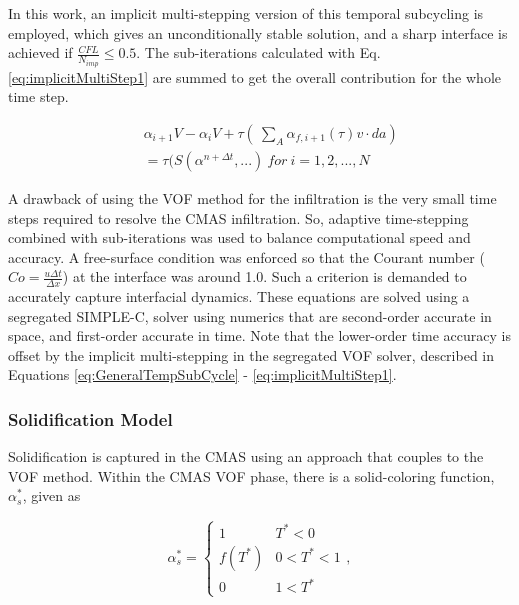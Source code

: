 \documentclass[%
 aip,
 amsmath,amssymb,
 reprint,%
]{revtex4-1}
\begin{document}
\noindent In this work, an implicit multi-stepping version of this temporal subcycling is employed, which gives an unconditionally stable solution, and a sharp interface is achieved if $\frac{CFL}{N_{imp}} \leqslant 0.5 $. The sub-iterations calculated with Eq. \ref{eq:implicitMultiStep1} are summed to get the overall contribution for the whole time step.

\begin{eqnarray}
\label{eq:implicitMultiStep1}
    &&\alpha_{i+1}V - \alpha_{i}V + \tau( \ \sum_{A}\alpha_{f,i+1}(\tau) v \cdot da) \nonumber \\
    &&=\tau(S(\alpha^{n+\Delta t},...) ~ for~ i = 1, 2, ..., N
\end{eqnarray}

A drawback of using the VOF method for the infiltration is the very small time steps required to resolve the CMAS infiltration. So, adaptive time-stepping combined with sub-iterations was used to balance computational speed and accuracy. A free-surface condition was enforced so that the Courant number ($Co = \frac{u \Delta t}{\Delta x}$) at the interface was around 1.0. Such a criterion is demanded to accurately capture interfacial dynamics. 
These equations are solved using a segregated SIMPLE-C, solver using numerics that are second-order accurate in space, and first-order accurate in time. Note that the lower-order time accuracy is offset by the implicit multi-stepping in the segregated VOF solver, described in Equations \ref{eq:GeneralTempSubCycle} - \ref{eq:implicitMultiStep1}. 

\subsubsection{Solidification Model}
\label{sec:solidmodel}
Solidification is captured in the CMAS using an approach that couples to the VOF method. Within the CMAS VOF phase, there is a solid-coloring function, $\alpha_s^*$, given as   

\begin{equation}
    \alpha^{*}_{s} = \begin{cases}
    1 & T^{*} < 0 \\
    f(T^{*})& 0<T^{*}<1 \\
    0& 1 < T^{*}
    \end{cases},
    \label{eq:solidificationModel}
\end{equation}
\end{document}
